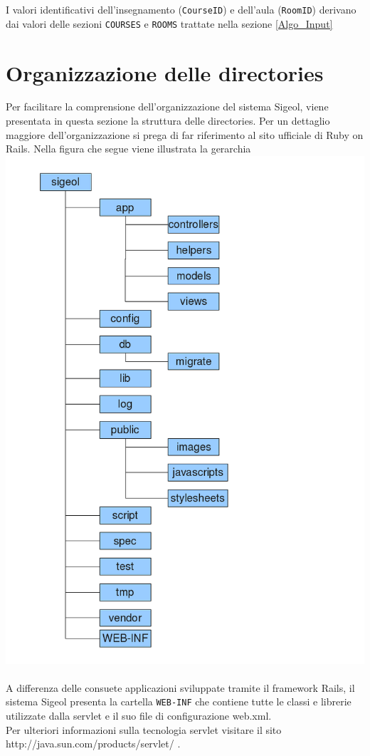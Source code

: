 \documentclass[11pt,a4paper]{article}
\begin{document}
I valori identificativi dell'insegnamento (\verb|CourseID|) e dell'aula (\verb|RoomID|) derivano dai valori delle sezioni \verb|COURSES| e \verb|ROOMS| trattate nella sezione \ref{Algo_Input}
\section{Organizzazione delle directories}
Per facilitare la comprensione dell'organizzazione del sistema Sigeol, viene presentata in questa sezione la struttura delle directories. Per un dettaglio maggiore dell'organizzazione si prega di far riferimento al sito ufficiale di Ruby on Rails. Nella figura che segue viene illustrata la gerarchia \\
\includegraphics[scale=0.59]{images/gerarchiacartelle.png} \\
\\
A differenza delle consuete applicazioni sviluppate tramite il framework Rails, il sistema Sigeol presenta la cartella \verb|WEB-INF| che contiene tutte le classi e librerie utilizzate dalla servlet e il suo file di configurazione web.xml.\\ Per ulteriori informazioni sulla tecnologia servlet visitare il sito \\ http://java.sun.com/products/servlet/ .
\end{document}
